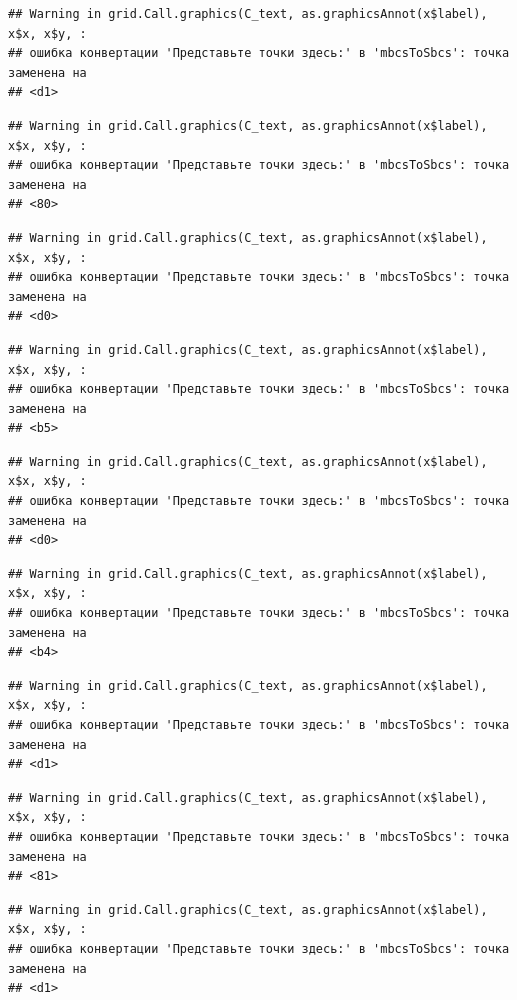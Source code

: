 \documentclass[]{book}
\begin{document}
\begin{verbatim}
## Warning in grid.Call.graphics(C_text, as.graphicsAnnot(x$label), x$x, x$y, :
## ошибка конвертации 'Представьте точки здесь:' в 'mbcsToSbcs': точка заменена на
## <d1>
\end{verbatim}

\begin{verbatim}
## Warning in grid.Call.graphics(C_text, as.graphicsAnnot(x$label), x$x, x$y, :
## ошибка конвертации 'Представьте точки здесь:' в 'mbcsToSbcs': точка заменена на
## <80>
\end{verbatim}

\begin{verbatim}
## Warning in grid.Call.graphics(C_text, as.graphicsAnnot(x$label), x$x, x$y, :
## ошибка конвертации 'Представьте точки здесь:' в 'mbcsToSbcs': точка заменена на
## <d0>
\end{verbatim}

\begin{verbatim}
## Warning in grid.Call.graphics(C_text, as.graphicsAnnot(x$label), x$x, x$y, :
## ошибка конвертации 'Представьте точки здесь:' в 'mbcsToSbcs': точка заменена на
## <b5>
\end{verbatim}

\begin{verbatim}
## Warning in grid.Call.graphics(C_text, as.graphicsAnnot(x$label), x$x, x$y, :
## ошибка конвертации 'Представьте точки здесь:' в 'mbcsToSbcs': точка заменена на
## <d0>
\end{verbatim}

\begin{verbatim}
## Warning in grid.Call.graphics(C_text, as.graphicsAnnot(x$label), x$x, x$y, :
## ошибка конвертации 'Представьте точки здесь:' в 'mbcsToSbcs': точка заменена на
## <b4>
\end{verbatim}

\begin{verbatim}
## Warning in grid.Call.graphics(C_text, as.graphicsAnnot(x$label), x$x, x$y, :
## ошибка конвертации 'Представьте точки здесь:' в 'mbcsToSbcs': точка заменена на
## <d1>
\end{verbatim}

\begin{verbatim}
## Warning in grid.Call.graphics(C_text, as.graphicsAnnot(x$label), x$x, x$y, :
## ошибка конвертации 'Представьте точки здесь:' в 'mbcsToSbcs': точка заменена на
## <81>
\end{verbatim}

\begin{verbatim}
## Warning in grid.Call.graphics(C_text, as.graphicsAnnot(x$label), x$x, x$y, :
## ошибка конвертации 'Представьте точки здесь:' в 'mbcsToSbcs': точка заменена на
## <d1>
\end{verbatim}
\end{document}
